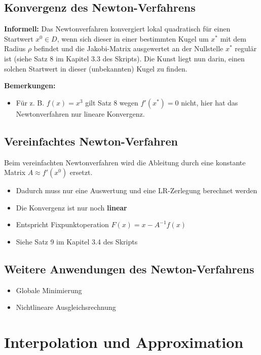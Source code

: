 \documentclass[a4paper]{article}
\begin{document}
\subsection{Konvergenz des Newton-Verfahrens}

\textbf{Informell:} Das Newtonverfahren konvergiert lokal quadratisch für einen
Startwert $x^0 \in D$, wenn sich dieser in einer bestimmten Kugel um $x^*$ mit
dem Radius $\rho$ befindet und die Jakobi-Matrix ausgewertet an der Nullstelle
$x^*$ regulär ist (siehe Satz 8 im Kapitel 3.3 des Skripts). Die Kunst liegt nun
darin, einen solchen Startwert in dieser (unbekannten) Kugel zu finden.

\textbf{Bemerkungen:}
\begin{itemize}
    \item Für z. B. $f(x) = x^3$ gilt Satz 8 wegen $f'(x^*) = 0$ nicht, hier hat
    das Newtonverfahren nur lineare Konvergenz.
\end{itemize}

\subsection{Vereinfachtes Newton-Verfahren}

Beim vereinfachten Newtonverfahren wird die Ableitung durch eine konstante
Matrix $A \approx f'(x^0)$ ersetzt. 
\begin{itemize}
    \item Dadurch muss nur eine Auswertung und eine LR-Zerlegung berechnet
    werden
    \item Die Konvergenz ist nur noch \textbf{linear} 
    \item Entspricht Fixpunktoperation $F(x) = x - A^{-1}f(x)$
    \item Siehe Satz 9 im Kapitel 3.4 des Skripts
\end{itemize}

\subsection{Weitere Anwendungen des Newton-Verfahrens}

\begin{itemize}
    \item Globale Minimierung
    \item Nichtlineare Ausgleichsrechnung
\end{itemize}

\section{Interpolation und Approximation}
\end{document}
